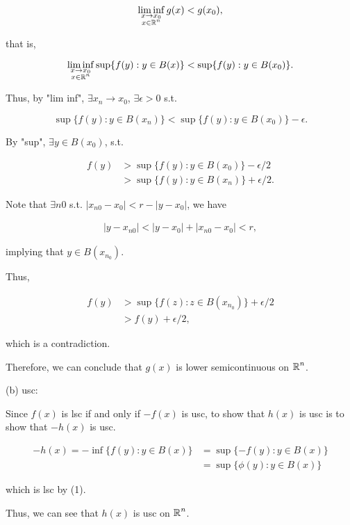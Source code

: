 \documentclass[UTF8,a4paper,10pt]{article}
\begin{document}
\[
\liminf_{\substack{x\to x_0 \\ x\in \operatorname{\mathbb{R}}^n}} g(x) < g(x_0),
\]

that is,

\[
\liminf_{\substack{x\to x_0 \\ x\in \operatorname{\mathbb{R}}^n}} \sup\{f(y) : y \in B(x)\} < \sup\{f(y) : y \in B(x_0)\}.
\]

Thus, by "lim inf", \(\exists x_n\to x_0\), \(\exists \epsilon>0\) s.t. 

\[
\sup\{f(y) : y \in B(x_n)\} < \sup\{f(y) : y \in B(x_0)\}-\epsilon.
\]

By "sup", \(\exists y\in B(x_0)\), s.t. 

\begin{align*}
  f(y) &> \sup\{f(y) : y \in B(x_0)\}-\epsilon/2\\
  &> \sup\{f(y) : y \in B(x_n)\}+\epsilon/2.
\end{align*}

Note that \(\exists n0\) s.t. \(|x_{n0}-x_0|< r-|y-x_0|\), we have

\begin{align*}
  |y - x_{n0}| < |y - x_0| + |x_{n0} - x_0| < r,
\end{align*}

implying that \(y\in B(x_{n_0})\).

Thus, 

\begin{align*}
  f(y) &> \sup \{f(z) : z\in B(x_{n_0})\} +\epsilon/2\\
  &> f(y) +\epsilon/2,
\end{align*}

which is a contradiction.

Therefore, we can conclude that \(g(x)\) is lower semicontinuous on \(\operatorname{\mathbb{R}}^n\).

\dotfill

(b) 
usc:

Since \(f(x)\) is lsc if and only if \(-f(x)\) is usc, to show that \(h(x)\) is usc is to show that \(-h(x)\) is usc.


\begin{align*}
  -h(x) = 
  -\inf\{f(y):y\in B(x)\} 
  &= \sup\{-f(y):y\in B(x)\} \\
  &= \sup\{\phi(y):y\in B(x)\}
\end{align*}

which is lsc by (1).

Thus, we can see that \(h(x)\) is usc on \(\operatorname{\mathbb{R}}^n\).

\dotfill
\end{document}
